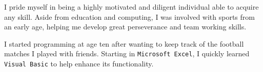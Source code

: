 \documentclass[9pt]{developercv} %
\begin{document}

\cvheader

\vspace{0.5cm}


\begin{minipage}[t]{0.4\textwidth} %
    \vspace{-\baselineskip} %
    I pride myself in being a highly motivated and diligent individual able to
    acquire any skill. Aside from education and computing, I was involved with
    sports from an early age, helping me develop great perseverance and team
    working skills. 

    I started programming at age ten after wanting to keep track of the
    football matches I played with friends. Starting in \texttt{Microsoft Excel}, I
    quickly learned \texttt{Visual Basic} to help enhance its functionality.
\end{minipage}
\hfill %
\begin{minipage}[t]{0.5\textwidth} %
    \vspace{-\baselineskip} %
    \begin{barchart}{5.5}
    \end{barchart}
\end{minipage}
\end{document}
